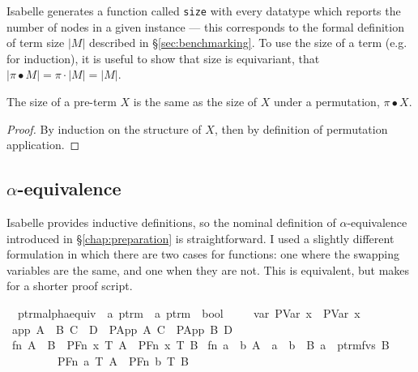 Isabelle generates a function called \texttt{size} with every datatype which reports the number of nodes in a given instance --- this corresponds to the formal definition of term size \(|M|\) described in \S\ref{sec:benchmarking}.
To use the size of a term (e.g. for induction), it is useful to show that size is equivariant, that \(|\pi \bullet M| = \pi \cdot |M| = |M|\).

\begin{lemma}
The size of a pre-term \(X\) is the same as the size of \(X\) under a permutation, \(\pi \bullet X\).
\end{lemma}
\begin{proof}
By induction on the structure of \(X\), then by definition of permutation application.
\end{proof}

\subsection{\(\alpha\)-equivalence}
Isabelle provides inductive definitions, so the nominal definition of \(\alpha\)-equivalence introduced in \S\ref{chap:preparation} is straightforward.
I used a slightly different formulation in which there are two cases for functions: one where the swapping variables are the same, and one when they are not.
This is equivalent, but makes for a shorter proof script.

\begin{implementation}
\isamarkupfalse%
\isanewline
\ \ ptrm{\isacharunderscore}alpha{\isacharunderscore}equiv\ {\isacharcolon}{\isacharcolon}\ {\isachardoublequoteopen}{\isacharprime}a\ ptrm\ {\isasymRightarrow}\ {\isacharprime}a\ ptrm\ {\isasymRightarrow}\ bool{\isachardoublequoteclose}\isanewline
\ \ \isanewline
\ \ var{\isacharcolon}\ {\isachardoublequoteopen}{\isacharparenleft}PVar\ x{\isacharparenright}\ {\isasymapprox}\ {\isacharparenleft}PVar\ x{\isacharparenright}{\isachardoublequoteclose}\isanewline
{\isacharbar}\ app{\isacharcolon}\ {\isachardoublequoteopen}{\isasymlbrakk}A\ {\isasymapprox}\ B{\isacharsemicolon}\ C\ {\isasymapprox}\ D{\isasymrbrakk}\ {\isasymLongrightarrow}\ {\isacharparenleft}PApp\ A\ C{\isacharparenright}\ {\isasymapprox}\ {\isacharparenleft}PApp\ B\ D{\isacharparenright}{\isachardoublequoteclose}\isanewline
{\isacharbar}\ fn{}{\isacharcolon}\ {\isachardoublequoteopen}A\ {\isasymapprox}\ B\ {\isasymLongrightarrow}\ {\isacharparenleft}PFn\ x\ T\ A{\isacharparenright}\ {\isasymapprox}\ {\isacharparenleft}PFn\ x\ T\ B{\isacharparenright}{\isachardoublequoteclose}\isanewline
{\isacharbar}\ fn{}{\isacharcolon}\ {\isachardoublequoteopen}{\isasymlbrakk}a\ {\isasymnoteq}\ b{\isacharsemicolon}\ A\ {\isasymapprox}\ {\isacharbrackleft}a\ {\isasymleftrightarrow}\ b{\isacharbrackright}\ {\isasymbullet}\ B{\isacharsemicolon}\ a\ {\isasymnotin}\ ptrm{\isacharunderscore}fvs\ B{\isasymrbrakk}\isanewline
\ \ \ \ \ \ \ \ {\isasymLongrightarrow}\ {\isacharparenleft}PFn\ a\ T\ A{\isacharparenright}\ {\isasymapprox}\ {\isacharparenleft}PFn\ b\ T\ B{\isacharparenright}{\isachardoublequoteclose}
\end{implementation}

